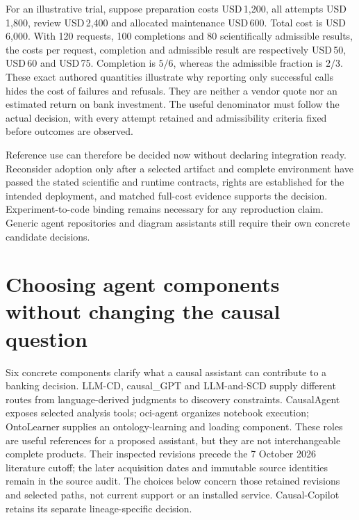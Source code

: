 For an illustrative trial, suppose preparation costs USD\,1,200, all attempts
USD\,1,800, review USD\,2,400 and allocated maintenance USD\,600. Total cost
is USD\,6,000. With 120 requests, 100 completions and 80 scientifically
admissible results, the costs per request, completion and admissible result
are respectively USD\,50, USD\,60 and USD\,75. Completion is $5/6$, whereas
the admissible fraction is $2/3$. These exact authored quantities illustrate
why reporting only successful calls hides the cost of failures and refusals.
They are neither a vendor quote nor an estimated return on bank investment.
The useful denominator must follow the actual decision, with every attempt
retained and admissibility criteria fixed before outcomes are observed.
\citep{exec25_copilot_choice}

Reference use can therefore be decided now without declaring integration
ready. Reconsider adoption only after a selected artifact and complete
environment have passed the stated scientific and runtime contracts, rights
are established for the intended deployment, and matched full-cost evidence
supports the decision. Experiment-to-code binding remains necessary for any
reproduction claim. Generic agent repositories and diagram assistants still
require their own concrete candidate decisions.
\label{sec:exec25-copilot-reuse-end}



\section{Choosing agent components without changing the causal question}
\label{sec:exec25-agents-reuse}
Six concrete components clarify what a causal assistant can contribute to a
banking decision. LLM-CD, causal\_GPT and LLM-and-SCD supply different routes
from language-derived judgments to discovery constraints. CausalAgent exposes
selected analysis tools; oci-agent organizes notebook execution; OntoLearner
supplies an ontology-learning and loading component. These roles are useful
references for a proposed assistant, but they are not interchangeable complete
products. Their inspected revisions precede the 7 October 2026 literature cutoff;
the later acquisition dates and immutable source identities remain in the
source audit. The choices below concern those retained revisions and selected
paths, not current support or an installed service. Causal-Copilot retains its
separate lineage-specific decision.~\citep{exec14_iid_cd,exec14_iid_gpt,exec14_iid_scd,exec13_data_causalagent_code,exec13_data_oci_code,exec13_data_ontolearner_code}


